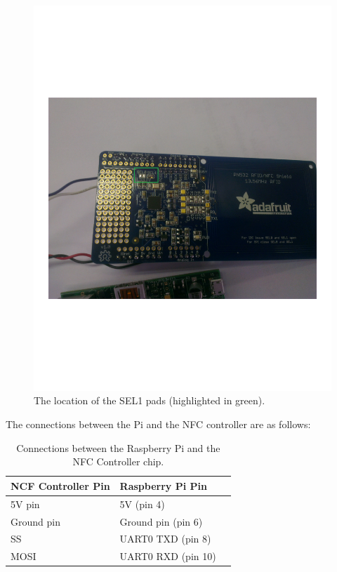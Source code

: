 \begin{figure}
 \centering 
 \includegraphics[clip=true, trim = 0 250 0 290,
 scale=0.7]{soldeer_pic}
 \caption{The location of the SEL1 pads (highlighted in green).}
 \label{fig:nfc-chip-solder}
\end{figure}

The connections between the Pi and the NFC controller are as follows: 

\begin{table}
\centering
 \caption{Connections between the Raspberry Pi and the NFC Controller chip.}
 \begin{tabular}{|l|l|l|}
  \hline
  \textbf{NCF Controller Pin} & \textbf{Raspberry Pi Pin}\\\hline\hline
  5V pin & 5V (pin 4) \\\hline
  Ground pin & Ground pin (pin 6) \\\hline
  SS & UART0 TXD (pin 8) \\\hline
  MOSI & UART0 RXD (pin 10) \\\hline
 \end{tabular}
\end{table}

